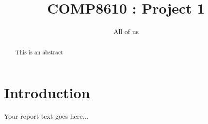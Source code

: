\documentclass[sigconf]{acmart}
\begin{document}
\title{COMP8610 : Project 1}

\author{All of us}

% 
\renewcommand\footnotetextcopyrightpermission[1]{}
\pagestyle{plain}

\begin{abstract}
  This is an abstract 
\end{abstract}

\maketitle


\section{Introduction}
Your report text goes here...
\end{document}
